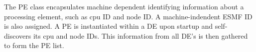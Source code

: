 
The PE class encapsulates machine dependent identifying information about
a processing element, such as cpu ID and node ID.  A machine-indendent ESMF ID
is also assigned.  A PE is instantiated within a DE upon startup and self-
discovers its cpu and node IDs.  This information from all DE's is then
gathered to form the PE list.
